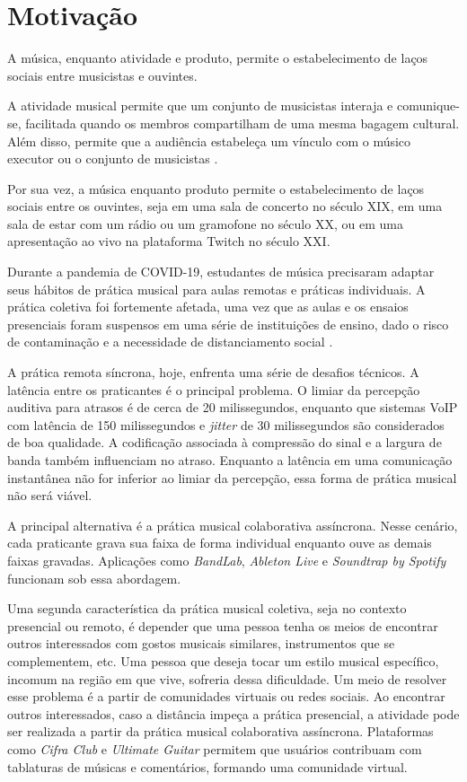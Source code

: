 \section{Motivação}
A música, enquanto atividade e produto, permite o estabelecimento de laços sociais
entre musicistas e ouvintes.

A atividade musical permite que um conjunto de musicistas interaja e
comunique-se, facilitada quando os membros compartilham de uma mesma bagagem
cultural. Além disso, permite que a audiência estabeleça um vínculo com
o músico executor ou o conjunto de musicistas \cite{cook2021music}.

Por sua vez, a música enquanto produto permite o estabelecimento de laços sociais
entre os ouvintes, seja em uma sala de concerto no século XIX, em uma sala de estar
com um rádio ou um gramofone no século XX, ou em uma apresentação ao vivo na
plataforma Twitch no século XXI.

Durante a pandemia de COVID-19, estudantes de música precisaram adaptar seus
hábitos de prática musical para aulas remotas e práticas individuais. A prática
coletiva foi fortemente afetada, uma vez que as aulas e os ensaios presenciais
foram suspensos em uma série de instituições de ensino, dado o risco de
contaminação e a necessidade de distanciamento social \cite{nusseck2021musical}.

A prática remota síncrona, hoje, enfrenta uma série de desafios técnicos. A
latência entre os praticantes é o principal problema. O limiar da percepção
auditiva para atrasos é de cerca de 20 milissegundos, enquanto que sistemas VoIP
com latência de 150 milissegundos e \textit{jitter} de 30 milissegundos são
considerados de boa qualidade. A codificação associada à compressão do sinal e a
largura de banda também influenciam no atraso. Enquanto a latência em uma
comunicação instantânea não for inferior ao limiar da percepção, essa forma de
prática musical não será viável.

A principal alternativa é a prática musical colaborativa assíncrona. Nesse
cenário, cada praticante grava sua faixa de forma individual enquanto ouve as
demais faixas gravadas. Aplicações como \textit{BandLab}, \textit{Ableton Live}
e \textit{Soundtrap by Spotify} funcionam sob essa abordagem.

Uma segunda característica da prática musical coletiva, seja no contexto
presencial ou remoto, é depender que uma pessoa tenha os meios de encontrar
outros interessados com gostos musicais similares, instrumentos que se
complementem, etc. Uma pessoa que deseja tocar um estilo musical específico,
incomum na região em que vive, sofreria dessa dificuldade. Um meio de resolver
esse problema é a partir de comunidades virtuais ou redes sociais. Ao encontrar
outros interessados, caso a distância impeça a prática presencial, a atividade
pode ser realizada a partir da prática musical colaborativa assíncrona.
Plataformas como \textit{Cifra Club} e \textit{Ultimate Guitar} permitem que
usuários contribuam com tablaturas de músicas e comentários, formando uma
comunidade virtual.


